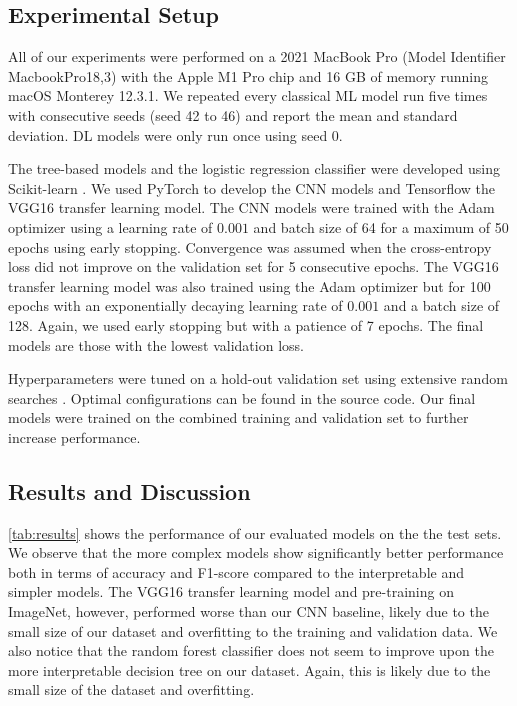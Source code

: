 \subsection{Experimental Setup}
All of our experiments were performed on a 2021 MacBook Pro (Model Identifier MacbookPro18,3) with the Apple M1 Pro chip and 16 GB of memory running macOS Monterey 12.3.1.
We repeated every classical ML model run five times with consecutive seeds (seed 42 to 46) and report the mean and standard deviation. DL models were only run once using seed 0.

The tree-based models and the logistic regression classifier were developed using Scikit-learn \citep{scikit-learn}. We used PyTorch \citep{pytorch2019} to develop the CNN models and Tensorflow \citep{tensorflow2015-whitepaper} the VGG16 transfer learning model. The CNN models were trained with the Adam optimizer \citep{kingma2014adam} using a learning rate of $0.001$ and batch size of 64 for a maximum of 50 epochs using early stopping. Convergence was assumed when the cross-entropy loss did not improve on the validation set for 5 consecutive epochs. The VGG16 transfer learning model was also trained using the Adam optimizer but for 100 epochs with an exponentially decaying learning rate of $0.001$ and a batch size of 128. Again, we used early stopping but with a patience of 7 epochs. The final models are those with the lowest validation loss.

Hyperparameters were tuned on a hold-out validation set using extensive random searches \citep{bergstra2012random}. Optimal configurations can be found in the source code. Our final models were trained on the combined training and validation set to further increase performance.


\subsection{Results and Discussion}

\autoref{tab:results} shows the performance of our evaluated models on the the test sets. We observe that the more complex models show significantly better performance both in terms of accuracy and F1-score compared to the interpretable and simpler models. The VGG16 transfer learning model and pre-training on ImageNet, however, performed worse than our CNN baseline, likely due to the small size of our dataset and overfitting to the training and validation data. We also notice that the random forest classifier does not seem to improve upon the more interpretable decision tree on our dataset. Again, this is likely due to the small size of the dataset and overfitting.

